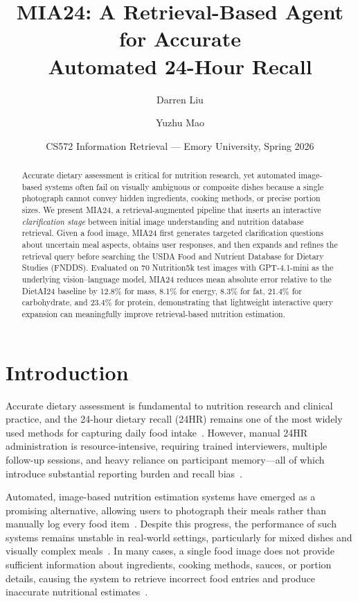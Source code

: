 \documentclass[11pt]{article}
\title{MIA24: A Retrieval-Based Agent for Accurate\\Automated 24-Hour Recall}
\author{Darren Liu \and Yuzhu Mao}
\date{CS572 Information Retrieval --- Emory University, Spring 2026}
\begin{document}
\maketitle

\begin{abstract}
Accurate dietary assessment is critical for nutrition research, yet automated image-based systems often fail on visually ambiguous or composite dishes because a single photograph cannot convey hidden ingredients, cooking methods, or precise portion sizes.
We present MIA24, a retrieval-augmented pipeline that inserts an interactive \emph{clarification stage} between initial image understanding and nutrition database retrieval.
Given a food image, MIA24 first generates targeted clarification questions about uncertain meal aspects, obtains user responses, and then expands and refines the retrieval query before searching the USDA Food and Nutrient Database for Dietary Studies (FNDDS).
Evaluated on 70 Nutrition5k test images with GPT-4.1-mini as the underlying vision--language model, MIA24 reduces mean absolute error relative to the DietAI24 baseline by 12.8\% for mass, 8.1\% for energy, 8.3\% for fat, 21.4\% for carbohydrate, and 23.4\% for protein, demonstrating that lightweight interactive query expansion can meaningfully improve retrieval-based nutrition estimation.
\end{abstract}

\section{Introduction}
\label{sec:intro}

Accurate dietary assessment is fundamental to nutrition research and clinical practice, and the 24-hour dietary recall (24HR) remains one of the most widely used methods for capturing daily food intake~\citep{thompson1994dietary,conway2003effectiveness}.
However, manual 24HR administration is resource-intensive, requiring trained interviewers, multiple follow-up sessions, and heavy reliance on participant memory---all of which introduce substantial reporting burden and recall bias~\citep{subar2012asa24,kipnis2003structure,thompson2010need}.

Automated, image-based nutrition estimation systems have emerged as a promising alternative, allowing users to photograph their meals rather than manually log every food item~\citep{zhu2010mobile,boushey2017new}.
Despite this progress, the performance of such systems remains unstable in real-world settings, particularly for mixed dishes and visually complex meals~\citep{dalakleidi2022applying,shonkoff2023ai}.
In many cases, a single food image does not provide sufficient information about ingredients, cooking methods, sauces, or portion details, causing the system to retrieve incorrect food entries and produce inaccurate nutritional estimates~\citep{tahir2021comprehensive}.
\end{document}
